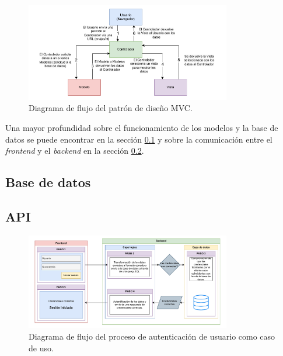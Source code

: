 \begin{figure}
    \centering
    \includegraphics[width=0.8\textwidth]{figures/theoric_frame/mvc.pdf}
    \caption{Diagrama de flujo del patrón de diseño MVC.}
    \label{fig:mvc}
\end{figure}

Una mayor profundidad sobre el funcionamiento de los modelos y la base de datos se puede encontrar en la sección \ref{sec:base_datos} y sobre la comunicación entre el \textit{frontend} y el \textit{backend} en la sección \ref{sec:api}.

\subsection{Base de datos}
\label{sec:base_datos}

\subsection{API}
\label{sec:api}

\begin{figure}
    \centering
    \includegraphics[width=0.8\textwidth]{figures/theoric_frame/use_case.pdf}
    \caption{Diagrama de flujo del proceso de autenticación de usuario como caso de uso.}
    \label{fig:use_case}
\end{figure}

